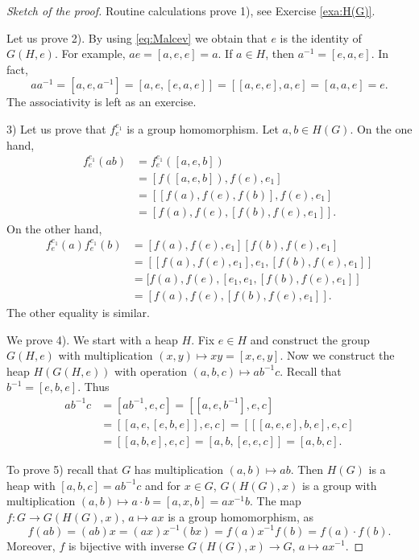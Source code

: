 \documentclass{svmult}
\begin{document}
\begin{proof}[Sketch of the proof]
    Routine calculations prove 1), see Exercise \ref{exa:H(G)}. 
    
    Let us prove 2). By using \eqref{eq:Malcev} we obtain that $e$ is the identity of $G(H,e)$. For example,
    $ae=[a,e,e]=a$. If $a\in H$, then $a^{-1}=[e,a,e]$. In fact,
    \[
    aa^{-1}=[a,e,a^{-1}]=[a,e,[e,a,e]]=[[a,e,e],a,e]=[a,a,e]=e.
    \]
    The associativity is left as an exercise. 
    
    3) Let us prove that $f_e^{e_1}$ is a group homomorphism. Let $a,b\in H(G)$. On the one hand,
    \begin{align*}
    f_e^{e_1}(ab)&=f_e^{e_1}([a,e,b])\\
    &=[f([a,e,b]),f(e),e_1]\\
    &=[[f(a),f(e),f(b)],f(e),e_1]\\
    &=[f(a),f(e),[f(b),f(e),e_1]].
    \end{align*}
    On the other hand, 
    \begin{align*}
    f_e^{e_1}(a)f_e^{e_1}(b)&=[f(a),f(e),e_1][f(b),f(e),e_1]\\
    &=[[f(a),f(e),e_1],e_1,[f(b),f(e),e_1]]\\
    &=[f(a),f(e),[e_1,e_1,[f(b),f(e),e_1]]\\
    &=[f(a),f(e),[f(b),f(e),e_1]].
    \end{align*}
    The other equality is similar. 
    
    We prove 4). We start with a heap $H$. 
    Fix $e\in H$ and construct the group $G(H,e)$ with
    multiplication $(x,y)\mapsto xy=[x,e,y]$. Now we construct the heap
    $H(G(H,e))$ with operation $(a,b,c)\mapsto ab^{-1}c$. Recall that 
    $b^{-1}=[e,b,e]$. Thus 
    \begin{align*}
        ab^{-1}c 
        &= [ab^{-1}, e, c]
        = [[a,e,b^{-1}],e,c]\\
        &= [[a,e,[e,b,e]],e,c]
        = [[[a,e,e],b,e],e,c]\\
        &= [[a,b,e],e,c]
        = [a,b,[e,e,c]]
        = [a,b,c].
    \end{align*}
    
    To prove 5) recall that $G$ has multiplication $(a,b)\mapsto ab$. 
    Then $H(G)$ is a heap with $[a,b,c]=ab^{-1}c$ and for $x\in G$, 
    $G(H(G),x)$ is a group with
    multiplication $(a,b)\mapsto a\cdot b=[a,x,b]=ax^{-1}b$. The 
    map $f\colon G\to G(H(G),x)$, $a\mapsto ax$ is a group homomorphism, as 
    \[
    f(ab)=(ab)x=(ax)x^{-1}(bx)=f(a)x^{-1}f(b)=f(a)\cdot f(b).
    \]
    Moreover, $f$ is bijective with inverse $G(H(G),x)\to G$, $a\mapsto ax^{-1}$. 
\end{proof}
\end{document}
